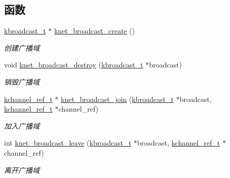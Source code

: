 \subsection*{函数}
\begin{DoxyCompactItemize}
\item 
\hyperlink{a00066_a1b551151864af85fa6cce57058153d04_a1b551151864af85fa6cce57058153d04}{kbroadcast\+\_\+t} $\ast$ \hyperlink{a00128_ga41a1258d2f4ae75120f26ab7f2326111_ga41a1258d2f4ae75120f26ab7f2326111}{knet\+\_\+broadcast\+\_\+create} ()
\begin{DoxyCompactList}\small\item\em 创建广播域 \end{DoxyCompactList}\item 
void \hyperlink{a00128_ga4b13b2545278c2324f4171ef0bbf990a_ga4b13b2545278c2324f4171ef0bbf990a}{knet\+\_\+broadcast\+\_\+destroy} (\hyperlink{a00066_a1b551151864af85fa6cce57058153d04_a1b551151864af85fa6cce57058153d04}{kbroadcast\+\_\+t} $\ast$broadcast)
\begin{DoxyCompactList}\small\item\em 销毁广播域 \end{DoxyCompactList}\item 
\hyperlink{a00066_a3b7e82599367eade261456f60ebe2cd9_a3b7e82599367eade261456f60ebe2cd9}{kchannel\+\_\+ref\+\_\+t} $\ast$ \hyperlink{a00128_ga1355d3863db663680b1c74363d3a5745_ga1355d3863db663680b1c74363d3a5745}{knet\+\_\+broadcast\+\_\+join} (\hyperlink{a00066_a1b551151864af85fa6cce57058153d04_a1b551151864af85fa6cce57058153d04}{kbroadcast\+\_\+t} $\ast$broadcast, \hyperlink{a00066_a3b7e82599367eade261456f60ebe2cd9_a3b7e82599367eade261456f60ebe2cd9}{kchannel\+\_\+ref\+\_\+t} $\ast$channel\+\_\+ref)
\begin{DoxyCompactList}\small\item\em 加入广播域 \end{DoxyCompactList}\item 
int \hyperlink{a00128_ga3bb02208a76f18bb2eee61955b3781cd_ga3bb02208a76f18bb2eee61955b3781cd}{knet\+\_\+broadcast\+\_\+leave} (\hyperlink{a00066_a1b551151864af85fa6cce57058153d04_a1b551151864af85fa6cce57058153d04}{kbroadcast\+\_\+t} $\ast$broadcast, \hyperlink{a00066_a3b7e82599367eade261456f60ebe2cd9_a3b7e82599367eade261456f60ebe2cd9}{kchannel\+\_\+ref\+\_\+t} $\ast$channel\+\_\+ref)
\begin{DoxyCompactList}\small\item\em 离开广播域 \end{DoxyCompactList}\item 

\end{DoxyCompactItemize}

